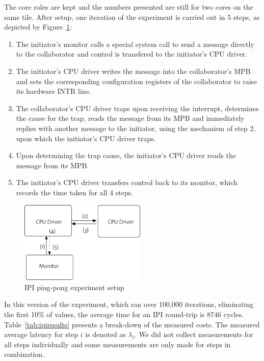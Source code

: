\documentclass[a4paper,twoside]{report} %
\begin{document}
The core roles are kept and the numbers presented are still for two
cores on the same tile. After setup, one iteration of the experiment
is carried out in 5 steps, as depicted by Figure~\ref{fig:ipibench}:

\begin{enumerate}
\item The initiator's monitor calls a special system call to send a
  message directly to the collaborator and control is transfered to the
  initiator's CPU driver.

\item The initiator's CPU driver writes the message into the collaborator's
  MPB and sets the corresponding configuration registers of the collaborator
  to raise its hardware INTR line.

\item The collaborator's CPU driver traps upon receiving the interrupt,
  determines the cause for the trap, reads the message from its MPB
  and immediately replies with another message to the initiator, using
  the mechanism of step 2, upon which the initiator's CPU driver
  traps.

\item Upon determining the trap cause, the initiator's CPU driver
  reads the message from its MPB.

\item The initiator's CPU driver transfers control back to its
  monitor, which records the time taken for all 4 steps.
\end{enumerate}


\begin{figure}
  \centering
  \includegraphics[width=6cm]{figures/exp2}
  \caption{IPI ping-pong experiment setup}
  \label{fig:ipibench}
\end{figure}

In this version of the experiment, which ran over 100,000 iterations,
eliminating the first 10\% of values, the average time for an IPI
round-trip is 8746 cycles. Table~\ref{tab:ipiresults} presents a
break-down of the measured costs. The measured average latency for
step $i$ is denoted as $\lambda_i$. We did not collect measurements
for all steps individually and some measurements are only made for
steps in combination.
\end{document}
